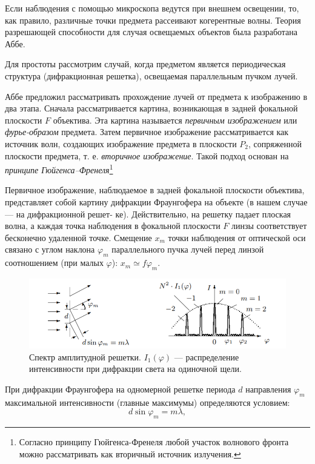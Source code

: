 \documentclass[12pt]{article}
\begin{document}
	Если наблюдения с помощью микроскопа ведутся при внешнем освещении, то,
	как правило, различные точки предмета рассеивают
	когерентные волны. Теория разрешающей способности для случая освещаемых 
	объектов была разработана Аббе.
	
	Для простоты рассмотрим случай, когда предметом является периодическая структура (дифракционная решетка), освещаемая	параллельным пучком лучей.
	
	Аббе предложил рассматривать прохождение лучей от предмета к изображению в два этапа.
	Сначала рассматривается
	картина, возникающая в задней фокальной плоскости
	$F$ объектива. Эта
	картина называется \textit{первичным изображением} или \textit{фурье-образом} предмета. Затем первичное изображение	рассматривается	как источник волн, создающих изображение предмета в плоскости
	$P_2$, сопряженной плоскости предмета, т. е. \textit{вторичное изображение}. Такой подход основан на \textit{принципе Гюйгенса–Френеля}\footnote{Согласно
	принципу Гюйгенса-Френеля любой участок волнового фронта можно рассматривать как вторичный источник излучения.}

	Первичное изображение, наблюдаемое в задней фокальной плоскости объектива, представляет собой картину дифракции Фраунгофера на объекте (в нашем случае
	— на дифракционной решет-
	ке). Действительно, на решетку падает плоская волна, а каждая точка	наблюдения в фокальной плоскости $F$ линзы соответствует бесконечно удаленной точке. Смещение $x_m$ точки наблюдения от оптической оси связано с углом наклона $\varphi_m$ параллельного пучка лучей перед линзой соотношением (при малых $\varphi$): $x_m \simeq f\varphi_m$.
	\begin{figure}
		\includegraphics{2}
		\caption{Спектр амплитудной решетки. $I_1(\varphi)$ — распределение интенсивности
			при дифракции света на одиночной щели.}
		\label{fig::difrac}
	\end{figure}

	При дифракции Фраунгофера на одномерной решетке периода	$d$ направления $\varphi_m$ максимальной интенсивности (главные максимумы) определяются
	условием:
	\begin{equation}
	d\sin\varphi_m = m\lambda,
	\label{eq::main_max}
	\end{equation}
	
\end{document}

